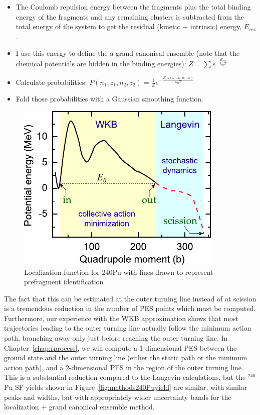 \begin{itemize}
	\item The Coulomb repulsion energy between the fragments plus the total binding energy of the fragments and any remaining clusters is subtracted from the total energy of the system to get the residual (kinetic + intrinsic) energy, $E_{res}$.
	\item I use this energy to define the a grand canonical ensemble (note that the chemical potentials are hidden in the binding energies): $Z = \sum e^{-\frac{E_{res}}{k_BT}}$
	\item Calculate probabilities: $P(n_1,z_1,n_2,z_2) = \frac{1}{Z} e^{-\frac{E_{res}(n_1,z_1,n_2,z_2)}{k_BT}}$
	\item Fold those probabilities with a Gaussian smoothing function.
\end{itemize}

\begin{figure}
	\centering
	\includegraphics[width=0.5\linewidth]{TeX_files/methods_overview}
	\caption[Localization function for 240Pu with lines drawn to represent prefragment identification]{Localization function for 240Pu with lines drawn to represent prefragment identification}
	\label{fig:methods240Pulocali}
\end{figure}

The fact that this can be estimated at the outer turning line instead of at scission is a tremendous reduction in the number of PES points which must be computed. Furthermore, our experience with the WKB approximation shows that most trajectories leading to the outer turning line actually follow the minimum action path, branching away only just before reaching the outer turning line. In Chapter~\ref{chap:rprocess}, we will compute a 1-dimensional PES between the ground state and the outer turning line (either the static path or the minimum action path), and a 2-dimensional PES in the region of the outer turning line. This is a substantial reduction compared to the Langevin calculations, but the $^{240}$Pu SF yields shown in Figure~\ref{fig:methods240Puyield} are similar, with similar peaks and widths, but with appropriately wider uncertainty bands for the localization + grand canonical ensemble method.

